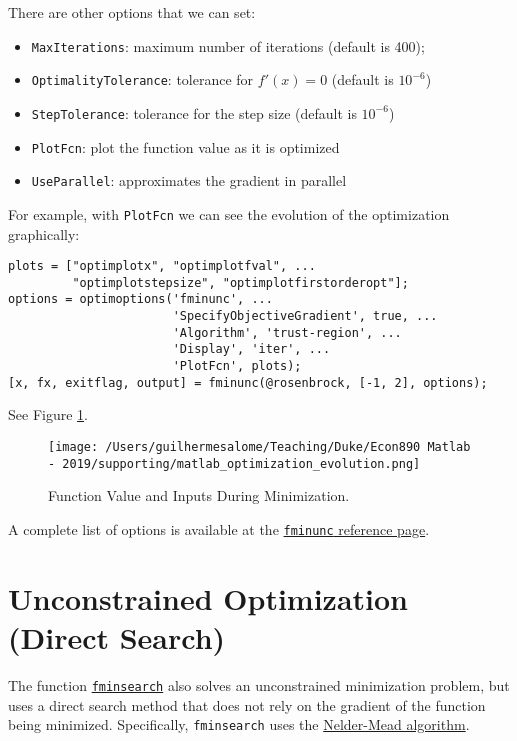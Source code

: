 \documentclass[12pt, a4paper]{article}
\begin{document}
There are other options that we can set:
\begin{itemize}
\item \texttt{MaxIterations}: maximum number of iterations (default is 400);
\item \texttt{OptimalityTolerance}: tolerance for \(f'(x)=0\) (default is \(10^{-6}\))
\item \texttt{StepTolerance}: tolerance for the step size (default is \(10^{-6}\))
\item \texttt{PlotFcn}: plot the function value as it is optimized
\item \texttt{UseParallel}: approximates the gradient in parallel
\end{itemize}

For example, with \texttt{PlotFcn} we can see the evolution of the optimization graphically:
\lstset{language=matlab,label= ,caption= ,captionpos=b,firstnumber=1,numbers=left,style=Matlab-editor}
\begin{lstlisting}
plots = ["optimplotx", "optimplotfval", ...
         "optimplotstepsize", "optimplotfirstorderopt"];
options = optimoptions('fminunc', ...
                       'SpecifyObjectiveGradient', true, ...
                       'Algorithm', 'trust-region', ...
                       'Display', 'iter', ...
                       'PlotFcn', plots);
[x, fx, exitflag, output] = fminunc(@rosenbrock, [-1, 2], options);
\end{lstlisting}
See Figure \ref{fig:org35a268a}.

\begin{figure}[H]
\centering
\texttt{[image: /Users/guilhermesalome/Teaching/Duke/Econ890 Matlab - 2019/supporting/matlab\_optimization\_evolution.png]}
\caption{\label{fig:org35a268a}
Function Value and Inputs During Minimization.}
\end{figure}

A complete list of options is available at the \href{https://www.mathworks.com/help/optim/ug/fminunc.html?s\_tid=doc\_ta\#butpb7p-options}{\texttt{fminunc} reference page}.
\section{Unconstrained Optimization (Direct Search)}
\label{sec:org3a874fd}
The function \href{https://www.mathworks.com/help/matlab/ref/fminsearch.html?s\_tid=doc\_ta}{\texttt{fminsearch}} also solves an unconstrained minimization problem, but uses a direct search method that does not rely on the gradient of the function being minimized.
Specifically, \texttt{fminsearch} uses the \href{https://www.mathworks.com/help/optim/ug/fminsearch-algorithm.html}{Nelder-Mead algorithm}.
\end{document}
